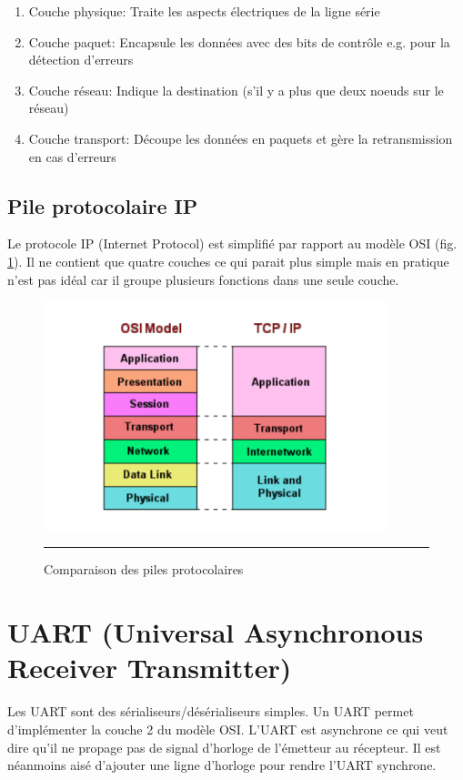 \begin{enumerate}
\item Couche physique: Traite les aspects électriques de la ligne série
\item Couche paquet: Encapsule les données avec des bits de contrôle e.g. pour la détection d'erreurs
\item Couche réseau: Indique la destination (s'il y a plus que deux noeuds sur le réseau)
\item Couche transport: Découpe les données en paquets et gère la retransmission en cas d'erreurs
\end{enumerate}

\subsection{Pile protocolaire IP}
Le protocole IP (Internet Protocol) est simplifié par rapport au modèle OSI (fig. \ref{fig:tcpip}). Il ne contient que quatre couches ce qui parait plus simple mais en pratique n'est pas idéal car il groupe plusieurs fonctions dans une seule couche.

\begin{figure}[htb]
  \centering
  \includegraphics[angle=0, width=10cm]{./Figures/serial/tcpipstack.pdf}
  \rule{35em}{0.5pt}
  \caption[tcpip]{Comparaison des piles protocolaires}
  \label{fig:tcpip}
\end{figure}

\section{UART (Universal Asynchronous Receiver Transmitter)}

Les UART sont des sérialiseurs/désérialiseurs simples. Un UART permet d'implémenter la couche 2 du modèle OSI. L'UART est asynchrone ce qui veut dire qu'il ne propage pas de signal d'horloge de l'émetteur au récepteur. Il est néanmoins aisé d'ajouter une ligne d'horloge pour rendre l'UART synchrone.

